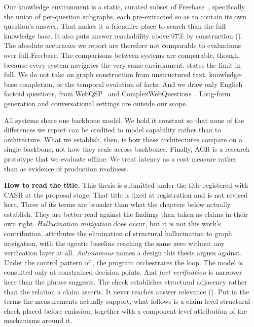 Our knowledge environment is a static, curated subset of
Freebase~\cite{bollacker2008freebase}, specifically the union of per-question
subgraphs, each pre-extracted so as to contain its own question's answer. That
makes it a friendlier place to search than the full knowledge base. It also puts
answer reachability above $97\%$ by construction ().
The absolute accuracies we report are therefore not comparable to evaluations
over full Freebase. The comparisons between systems are comparable, though,
because every system navigates the very same environment. 
states the limit in full. We do not take on graph construction from unstructured
text, knowledge-base completion, or the temporal evolution of facts. And we draw
only English factoid questions, from WebQSP~\cite{yih2016value} and
ComplexWebQuestions~\cite{talmor2018web}. Long-form generation and
conversational settings are outside our scope.

All systems share one backbone model. We hold it constant so that none of the
differences we report can be credited to model capability rather than to
architecture. What we establish, then, is how these architectures compare on a
single backbone, not how they scale across backbones. Finally, AGR is a research
prototype that we evaluate offline. We treat latency as a cost measure rather
than as evidence of production readiness.

\textbf{How to read the title.} This thesis is submitted under the title
registered with CASR at the proposal stage. That title is fixed at registration
and is not revised here. Three of its terms are broader than what the chapters
below actually establish. They are better read against the findings than taken
as claims in their own right. \emph{Hallucination mitigation} does occur, but it
is not this work's contribution.  attributes the
elimination of structural hallucination to graph navigation, with the agentic
baseline reaching the same zero without any verification layer at all.
\emph{Autonomous} names a design this thesis argues against. Under the control
pattern of , the program orchestrates the loop. The model
is consulted only at constrained decision points. And \emph{fact verification}
is narrower here than the phrase suggests. The check establishes structural
adjacency rather than the relation a claim asserts. It never reaches answer
relevance (). Put in the terms the measurements
actually support, what follows is a claim-level structural check placed before
emission, together with a component-level attribution of the mechanisms around
it.

